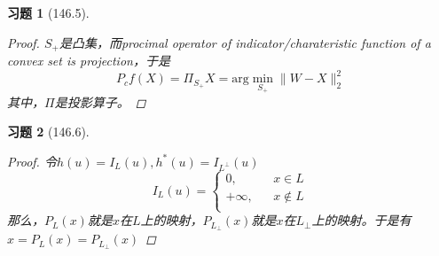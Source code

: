 \documentclass[a4paper, UTF8]{ctexart}
\newtheorem*{exercise}{\textbf{习题}}
\begin{document}
	\begin{exercise}[146.5]
		\begin{proof}
			$S_+$是凸集，而procimal operator of indicator/charateristic function of a convex set is projection，于是
			\begin{equation}
				P_c f \left(X\right) = \Pi_{S_+}X = \mathrm{arg}\min\limits_{S_+}\lVert W - X\rVert_2^2	
			\end{equation}		
			其中，$\Pi$是投影算子。
		\end{proof}	
	\end{exercise}

	\begin{exercise}[146.6]
		\begin{proof}
			令$h \left(u\right) = I_L\left(u\right), h^*\left(u\right) = I_{L^\perp}\left(u\right)$	
			\begin{equation}
				I_L\left(u\right) = \left\{
				\begin{aligned}
					0, &   & x \in L \\
					+\infty, &   & x \not\in L\\				
				\end{aligned}
				\right.
			\end{equation}
			那么，$P_L\left(x\right)$就是$x$在$L$上的映射，$P_{L_\perp}\left(x\right)$就是$x$在$L_\perp$上的映射。于是有$x = P_L \left(x\right) = P_{L_\perp}\left(x\right)$
		\end{proof}	
	\end{exercise}
\end{document}

